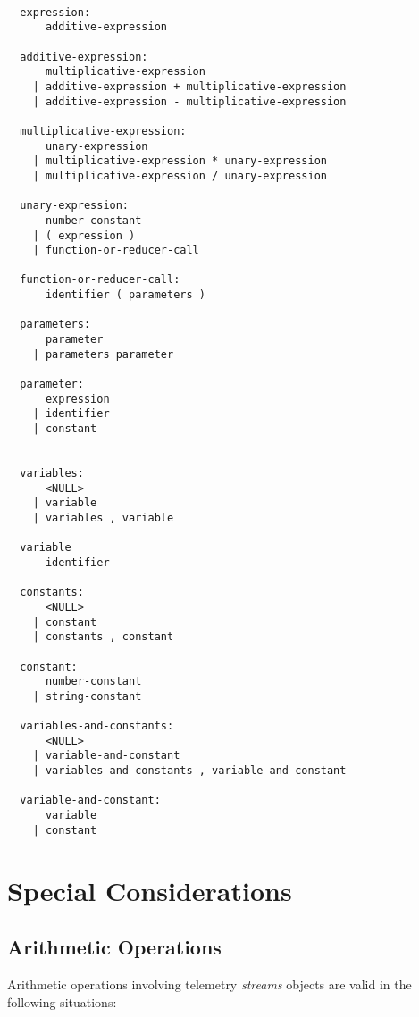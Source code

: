\begin{verbatim}
  
  expression:
      additive-expression

  additive-expression:
      multiplicative-expression
    | additive-expression + multiplicative-expression
    | additive-expression - multiplicative-expression

  multiplicative-expression:
      unary-expression
    | multiplicative-expression * unary-expression
    | multiplicative-expression / unary-expression

  unary-expression:
      number-constant
    | ( expression )
    | function-or-reducer-call

  function-or-reducer-call:
      identifier ( parameters )

  parameters:
      parameter
    | parameters parameter
    
  parameter:
      expression
    | identifier 
    | constant
    
   
  variables:
      <NULL>
    | variable
    | variables , variable
    
  variable
      identifier
    
  constants:
      <NULL>
    | constant
    | constants , constant
   
  constant:
      number-constant
    | string-constant
   
  variables-and-constants:
      <NULL>
    | variable-and-constant
    | variables-and-constants , variable-and-constant
      
  variable-and-constant:
      variable
    | constant    
\end{verbatim}


 
 
\section{Special Considerations}


\subsection{Arithmetic Operations}

Arithmetic operations involving telemetry \textit{streams} objects are valid in the following situations:

